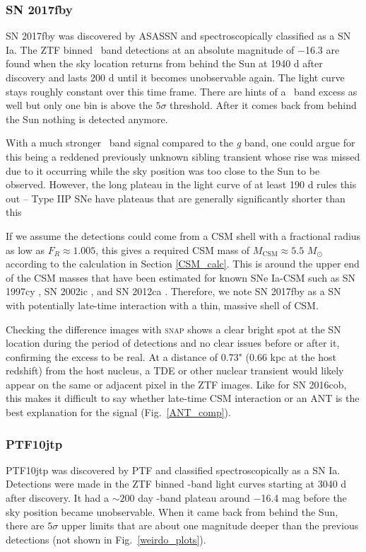 \documentclass[a4paper,oneside,12pt, class=Latex/Classes/PhDthesisPSnPDF, crop=false]{standalone}
\begin{document}
\subsubsection*{SN 2017fby}
SN 2017fby was discovered by ASASSN and spectroscopically classified as a SN Ia. The ZTF binned \ztfr\ band detections at an absolute magnitude of $-$16.3 are found when the sky location returns from behind the Sun at 1940 d after discovery and lasts 200 d until it becomes unobservable again. The light curve stays roughly constant over this time frame. There are hints of a \ztfg\ band excess as well but only one bin is above the $5\sigma$ threshold. After it comes back from behind the Sun nothing is detected anymore.

With a much stronger \ztfr\ band signal compared to the \textit{g} band, one could argue for this being a reddened previously unknown sibling transient whose rise was missed due to it occurring while the sky position was too close to the Sun to be observed. However, the long plateau in the light curve of at least 190 d rules this out -- Type IIP SNe have plateaus that are generally significantly shorter than this \citep{IIL_IIP, SN_II_V_band_lcs}

If we assume the detections could come from a CSM shell with a fractional radius as low as $F_R \approx 1.005$, this gives a required CSM mass of $M_\text{CSM} \approx 5.5$ $M_\odot$ according to the calculation in Section \ref{CSM_calc}. This is around the upper end of the CSM masses that have been estimated for known SNe Ia-CSM such as SN 1997cy \citep{Chugai_2004}, SN 2002ic \citep{Chugai_2004, Inserra_2016}, and SN 2012ca \citep{Inserra_2016}. Therefore, we note SN 2017fby as a SN with potentially late-time interaction with a thin, massive shell of CSM.

Checking the difference images with \textsc{snap} shows a clear bright spot at the SN location during the period of detections and no clear issues before or after it, confirming the excess to be real. At a distance of 0.73" (0.66 kpc at the host redshift) from the host nucleus, a TDE or other nuclear transient would likely appear on the same or adjacent pixel in the ZTF images. Like for SN 2016cob, this makes it difficult to say whether late-time CSM interaction or an ANT is the best explanation for the signal (Fig.~\ref{ANT_comp}).


\subsubsection*{PTF10jtp}
PTF10jtp was discovered by PTF and classified spectroscopically as a SN Ia. Detections were made in the ZTF binned \ztfr-band light curves starting at 3040 d after discovery. It had a $\sim 200$ day \ztfr-band plateau around $-$16.4 mag before the sky position became unobservable. When it came back from behind the Sun, there are $5\sigma$ upper limits that are about one magnitude deeper than the previous detections (not shown in Fig.~\ref{weirdo_plots}). 
\end{document}
